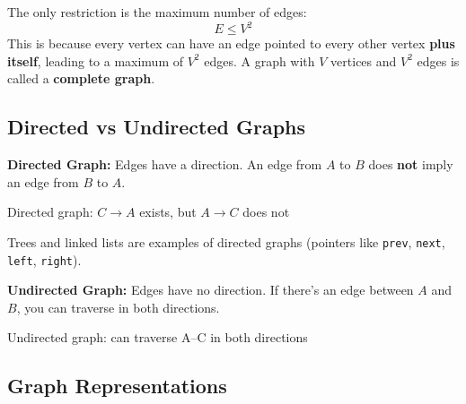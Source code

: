 \documentclass{article}
\begin{document}
The only restriction is the maximum number of edges:
\[
E \leq V^2
\]
This is because every vertex can have an edge pointed to every other vertex \textbf{plus itself}, leading to a maximum of $V^2$ edges. A graph with $V$ vertices and $V^2$ edges is called a \textbf{complete graph}.

\subsection{Directed vs Undirected Graphs}

\textbf{Directed Graph:}
Edges have a direction. An edge from $A$ to $B$ does \textbf{not} imply an edge from $B$ to $A$.

\begin{center}

{\small Directed graph: $C \to A$ exists, but $A \to C$ does not}
\end{center}

Trees and linked lists are examples of directed graphs (pointers like \texttt{prev}, \texttt{next}, \texttt{left}, \texttt{right}).

\textbf{Undirected Graph:}
Edges have no direction. If there's an edge between $A$ and $B$, you can traverse in both directions.

\begin{center}

{\small Undirected graph: can traverse A--C in both directions}
\end{center}

\subsection{Graph Representations}
\end{document}
